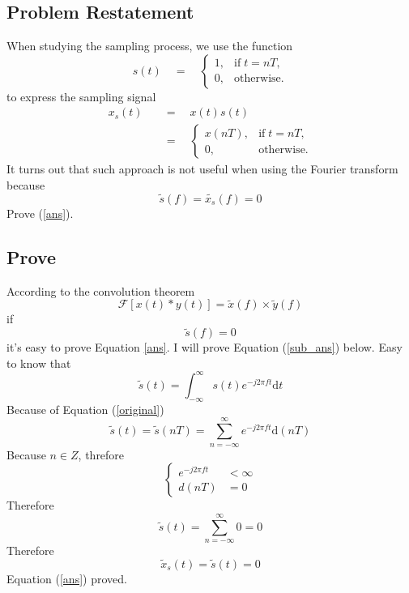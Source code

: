 \documentclass{article}
\begin{document}
\subsection{Problem Restatement}
When studying the sampling process, we use the function
\begin{equation}
    s(t) \quad = \quad \left\{ 
        \begin{array}{lr}
            1, & \mathrm{if}\; t = nT,\\
            0, & \mathrm{otherwise.}
        \end{array}
    \right.
    \label{original}
\end{equation}
to express the sampling signal
\begin{align}
    x_s(t) \quad &= \quad x(t)s(t)\\
    &= \quad \left\{
        \begin{array}{lr}
            x(nT), & \mathrm{if}\; t = nT,\\
            0, & \mathrm{otherwise.}
        \end{array}
    \right.
\end{align}
It turns out that such approach is not useful when using the Fourier transform because
\begin{equation}
    \widetilde{s}(f) = \widetilde{x_s}(f) = 0 
    \label{ans}
\end{equation}
Prove (\ref{ans}).
\subsection{Prove}
According to the convolution theorem
\begin{equation*}
    \mathcal{F}\left[ x(t)*y(t) \right] = \widetilde{x}(f) \times \widetilde{y}(f)
\end{equation*}
if 
\begin{equation}
    \widetilde{s}(f) = 0
    \label{sub_ans}
\end{equation}
it's easy to prove Equation \ref{ans}.
I will prove Equation (\ref{sub_ans}) below. Easy to know that
\begin{equation*}
    \widetilde{s}(t) = \int_{-\infty}^{\infty} s(t) e^{-j2\pi ft} \mathrm{d}t
\end{equation*}
Because of Equation (\ref{original})
$$\widetilde{s}(t) = \widetilde{s}(nT) = \sum_{n = -\infty}^{\infty} e^{-j2\pi ft} \mathrm{d}(nT)$$
Because $n \in Z$, threfore
$$
\left\{
    \begin{array}{rl}
    e^{-j2\pi ft} &< \infty\\
    d(nT) &= 0
    \end{array}
\right.
$$
Therefore
\begin{equation*}
    \widetilde{s}(t) = \sum_{n = -\infty}^{\infty} 0 = 0
\end{equation*}
Therefore
\begin{equation*}
    \widetilde{x}_s(t) = \widetilde{s}(t) = 0
\end{equation*}
Equation (\ref{ans}) proved.
\end{document}
